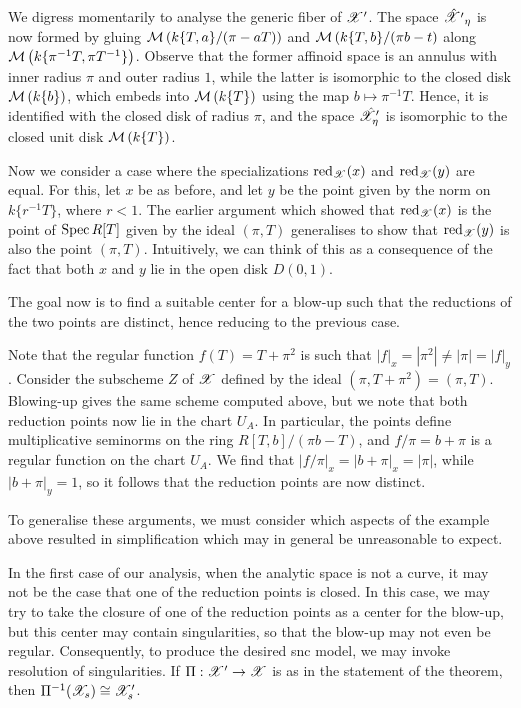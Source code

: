We digress momentarily to analyse the generic fiber of $\mathscr{X}^\prime$.
The space $\hat{\mathscr{X}^{\prime}}_{\eta}$ is now formed by gluing $\mathcal{M}\left(k\{T, a\}/(\pi - a T)\right)$ and $\mathcal{M}\left(k\{T, b\}/(\pi b - t\right)$ along $\mathcal{M}\left(k\{\pi^{-1} T, \pi T^{-1}\}\right)$.
Observe that the former affinoid space is an annulus with inner radius $\pi$ and outer radius $1$, while the latter is isomorphic to the closed disk $\mathcal{M}\left(k\{b\}\right)$, which embeds into $\mathcal{M}\left(k\{T\}\right)$ using the map $b \mapsto \pi^{-1} T$. Hence, it is identified with the closed disk of radius $\pi$, and the space $\hat{\mathscr{X}}^{\prime}_{\eta}$ is isomorphic to the closed unit disk $\mathcal{M}\left(k\{T\}\right)$.

Now we consider a case where the specializations $\operatorname{red}_{\mathscr{X}}(x)$ and $\operatorname{red}_{\mathscr{X}}(y)$ are equal. 
For this, let $x$ be as before, and let $y$ be the point given by the norm on $k\{r^{-1} T\}$, where $r < 1$.
The earlier argument which showed that $\operatorname{red}_{\mathscr{X}}(x)$ is the point of $\operatorname{Spec} R[T]$ given by the ideal $(\pi, T)$ generalises to show that $\operatorname{red}_{\mathscr{X}}(y)$ is also the point $(\pi, T)$.
Intuitively, we can think of this as a consequence of the fact that both $x$ and $y$ lie in the open disk $D(0, 1)$.

The goal now is to find a suitable center for a blow-up such that the reductions of the two points are distinct, hence reducing to the previous case.

Note that the regular function $f(T) = T + \pi^2$ is such that $|f|_x = |\pi^{2}| \neq |\pi| = |f|_y$.
Consider the subscheme $Z$ of $\mathscr{X}$ defined by the ideal $(\pi, T + \pi^2) = (\pi, T)$.
Blowing-up gives the same scheme computed above, but we note that both reduction points now lie in the chart $U_A$.
In particular, the points define multiplicative seminorms on the ring $R[T, b]/(\pi b - T)$, and $f/\pi = b + \pi$ is a regular function on the chart $U_A$.
We find that $|f/\pi|_x = |b + \pi|_x = |\pi|$, while $|b + \pi|_y = 1$, so it follows that the reduction points are now distinct.

To generalise these arguments, we must consider which aspects of the example above resulted in simplification which may in general be unreasonable to expect.

In the first case of our analysis, when the analytic space is not a curve, it may not be the case that one of the reduction points is closed.
In this case, we may try to take the closure of one of the reduction points as a center for the blow-up, but this center may contain singularities, so that the blow-up may not even be regular.
Consequently, to produce the desired snc model, we may invoke resolution of singularities.
If $\Pi: \mathscr{X}' \to \mathscr{X}$ is as in the statement of the theorem, then $\Pi^{-1}(\mathscr{X}_s) \cong \mathscr{X}'_s$.

